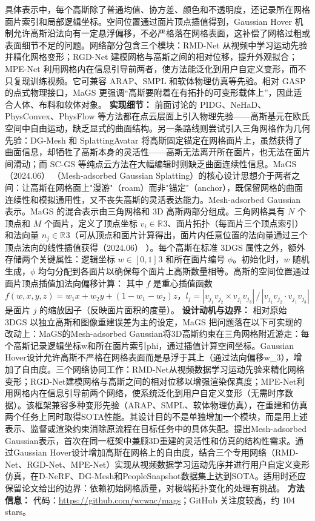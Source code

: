 具体表示中，每个高斯除了普通均值、协方差、颜色和不透明度，还记录所在网格面片索引和局部逻辑坐标。空间位置通过面片顶点插值得到，Gaussian Hover 机制允许高斯沿法向有一定悬浮偏移，不必严格落在网格表面，这补偿了网格过粗或表面细节不足的问题。网络部分包含三个模块：RMD-Net 从视频中学习运动先验并精化网格变形；RGD-Net 建模网格与高斯之间的相对位移，提升外观拟合；MPE-Net 利用网格内在信息引导前两者，使方法能泛化到用户自定义变形，而不只复现训练视频。它可兼容 ARAP、SMPL 和软体物理仿真等先验。相对 GASP 的点式物理接口，MaGS 更强调“高斯要附着在有拓扑的可变形载体上”，因此适合人体、布料和软体对象。
\textbf{实现细节：} 前面讨论的 PIDG、NeHaD、PhysConvex、PhysFlow 等方法都在点云层面上引入物理先验——高斯基元在欧氏空间中自由运动，缺乏显式的曲面结构。另一条路线则尝试引入三角网格作为几何先验：DG-Mesh 和 SplattingAvatar 将高斯固定锚定在网格面片上，虽然获得了曲面信息，却牺牲了高斯本身的灵活性——高斯无法离开所在面片，也无法在面片间滑动；而 SC-GS 等纯点云方法在大幅编辑时则缺乏曲面连续性信息。MaGS（2024.06） （Mesh-adsorbed Gaussian Splatting）的核心设计思想介于两者之间：让高斯在网格面上"漫游"（roam）而非"锚定"（anchor），既保留网格的曲面连续性和模拟通用性，又不丧失高斯的灵活表达能力。Mesh-adsorbed Gaussian 表示。MaGS 的混合表示由三角网格和 3D 高斯两部分组成。三角网格具有 $N$ 个顶点和 $M$ 个面片，定义了顶点坐标 $v_i \in \mathbb{R}^{}3$、面片拓扑（每面片三个顶点索引）和法向量 $n_j \in \mathbb{R}^{}3$（可从顶点和面片计算得出，面片内任意位置的法向量通过三个顶点法向的线性插值获得（2024.06） ）。每个高斯在标准 3DGS 属性之外，额外存储两个关键属性：逻辑坐标 $w \in [0,1]^{}3$ 和所在面片编号 $\phi$。初始化时，$w$ 随机生成，$\phi$ 均匀分配到各面片以确保每个面片上高斯数量相等。高斯的空间位置通过面片顶点插值加法向偏移计算： 其中 $f$ 是重心插值函数 $f(w, x, y, z) = w_1 x + w_2 y + (1 - w_1 - w_2)z$，$l_j = |v_{j_1}v_{j_2} \times v_{j_1}v_{j_3}| \, / \, |v_{j_1}v_{j_2} \cdot v_{j_1}v_{j_3}|$ 是面片 $j$ 的缩放因子（反映面片面积的度量）。
\textbf{设计动机与边界：} 相对原始 3DGS 以独立高斯和图像重建误差为主的设定，MaGS 把问题落在以下可实现的改动上：MaGS的Mesh-adsorbed Gaussian将3D高斯约束在三角网格附近游走：每个高斯记录逻辑坐标w和所在面片索引phi，通过插值计算空间坐标。Gaussian Hover设计允许高斯不严格在网格表面而是悬浮于其上（通过法向偏移w\_3），增加了自由度。三个网络协同工作：RMD-Net从视频数据学习运动先验来精化网格变形；RGD-Net建模网格与高斯之间的相对位移以增强渲染保真度；MPE-Net利用网格内在信息引导前两个网络，使系统泛化到用户自定义变形（无需时序数据）。该框架兼容多种变形先验（ARAP、SMPL、软体物理仿真），在重建和仿真两个任务上同时取得SOTA性能。其设计目的不是单独增加一个模块，而是用上述表示、监督或渲染约束消除原流程在目标任务中的具体失配。提出Mesh-adsorbed Gaussian表示，首次在同一框架中兼顾3D重建的灵活性和仿真的结构性需求。通过Gaussian Hover设计增加高斯在网格上的自由度，结合三个专用网络（RMD-Net、RGD-Net、MPE-Net）实现从视频数据学习运动先序并进行用户自定义变形仿真，在D-NeRF、DG-Mesh和PeopleSnapshot数据集上达到SOTA。适用时还应保留论文给出的边界：依赖初始网格质量，对极端拓扑变化的处理有挑战。
\textbf{方法信息：} 代码：\url{https://github.com/wcwac/mags}；GitHub 关注度较高，约 104 stars。



